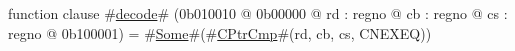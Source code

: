 function clause #\hyperref[zdecode]{decode}# (0b010010 @ 0b00000 @ rd : regno @ cb : regno @ cs : regno @ 0b100001) = #\hyperref[zSome]{Some}#(#\hyperref[zCPtrCmp]{CPtrCmp}#(rd, cb, cs, CNEXEQ))
